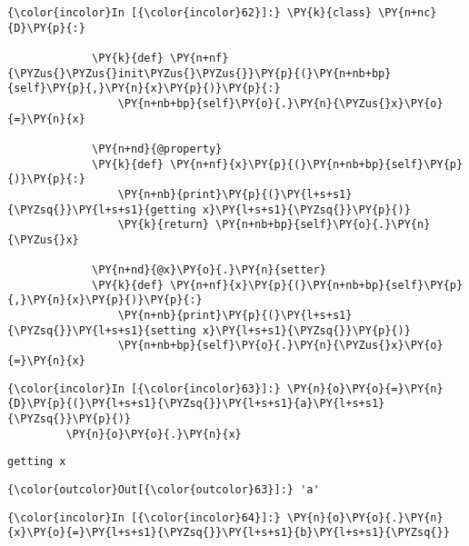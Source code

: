     \begin{Verbatim}[commandchars=\\\{\}]
{\color{incolor}In [{\color{incolor}62}]:} \PY{k}{class} \PY{n+nc}{D}\PY{p}{:}
             
             \PY{k}{def} \PY{n+nf}{\PYZus{}\PYZus{}init\PYZus{}\PYZus{}}\PY{p}{(}\PY{n+nb+bp}{self}\PY{p}{,}\PY{n}{x}\PY{p}{)}\PY{p}{:}
                 \PY{n+nb+bp}{self}\PY{o}{.}\PY{n}{\PYZus{}x}\PY{o}{=}\PY{n}{x}
                 
             \PY{n+nd}{@property}
             \PY{k}{def} \PY{n+nf}{x}\PY{p}{(}\PY{n+nb+bp}{self}\PY{p}{)}\PY{p}{:}
                 \PY{n+nb}{print}\PY{p}{(}\PY{l+s+s1}{\PYZsq{}}\PY{l+s+s1}{getting x}\PY{l+s+s1}{\PYZsq{}}\PY{p}{)}
                 \PY{k}{return} \PY{n+nb+bp}{self}\PY{o}{.}\PY{n}{\PYZus{}x}
             
             \PY{n+nd}{@x}\PY{o}{.}\PY{n}{setter}
             \PY{k}{def} \PY{n+nf}{x}\PY{p}{(}\PY{n+nb+bp}{self}\PY{p}{,}\PY{n}{x}\PY{p}{)}\PY{p}{:}
                 \PY{n+nb}{print}\PY{p}{(}\PY{l+s+s1}{\PYZsq{}}\PY{l+s+s1}{setting x}\PY{l+s+s1}{\PYZsq{}}\PY{p}{)}
                 \PY{n+nb+bp}{self}\PY{o}{.}\PY{n}{\PYZus{}x}\PY{o}{=}\PY{n}{x}
\end{Verbatim}

    \begin{Verbatim}[commandchars=\\\{\}]
{\color{incolor}In [{\color{incolor}63}]:} \PY{n}{o}\PY{o}{=}\PY{n}{D}\PY{p}{(}\PY{l+s+s1}{\PYZsq{}}\PY{l+s+s1}{a}\PY{l+s+s1}{\PYZsq{}}\PY{p}{)}
         \PY{n}{o}\PY{o}{.}\PY{n}{x}
\end{Verbatim}

    \begin{Verbatim}[commandchars=\\\{\}]
getting x

    \end{Verbatim}

            \begin{Verbatim}[commandchars=\\\{\}]
{\color{outcolor}Out[{\color{outcolor}63}]:} 'a'
\end{Verbatim}
        
    \begin{Verbatim}[commandchars=\\\{\}]
{\color{incolor}In [{\color{incolor}64}]:} \PY{n}{o}\PY{o}{.}\PY{n}{x}\PY{o}{=}\PY{l+s+s1}{\PYZsq{}}\PY{l+s+s1}{b}\PY{l+s+s1}{\PYZsq{}}
\end{Verbatim}

